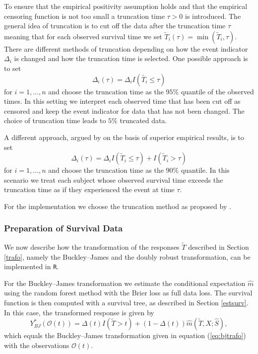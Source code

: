\documentclass[12pt, a4paper]{scrartcl}
\theoremstyle{definition}
\theoremstyle{plain}
\numberwithin{equation}{section}
\numberwithin{figure}{section}
\numberwithin{table}{section}
\begin{document}
	To ensure that the empirical positivity assumption holds and that the empirical censoring function is not too small a truncation time $\tau>0$ is introduced.
	The general idea of truncation is to cut off the data after the truncation time $\tau$ meaning that for each observed survival time we set $\tilde{T}_i(\tau)=\min(\tilde{T}_i, \tau)$.
	There are different methods of truncation depending on how the event indicator $\Delta_i$ is changed and how the truncation time is selected.
	One possible approach is to set $$\Delta_i(\tau) = \Delta_i I(\tilde{T_i} \leq \tau)$$  for $i=1,\dots,n$ and choose the truncation time as the $95\%$ quantile of the observed times.
	In this setting we interpret each observed time that has been cut off as censored and keep the event indicator for data that has not been changed.
	The choice of truncation time leads to $5\%$ truncated data.
	
	A different approach, argued by \citet*{drtrees} on the basis of superior empirical results, is to set $$\Delta_i(\tau) = \Delta_i I(\tilde{T}_i\leq \tau) + I(\tilde{T}_i > \tau)$$ for $i=1,\dots,n$ and choose the truncation time as the $90\%$ quantile.
	In this scenario we treat each subject whose observed survival time exceeds the truncation time as if they experienced the event at time $\tau$.
	
	For the implementation we choose the truncation method as proposed by \citet*{drtrees}.
	\subsubsection{Preparation of Survival Data}
	
	We now describe how the transformation of the responses $\tilde T$ described in Section \ref{trafo}, namely the Buckley--James and the doubly robust transformation, can be implemented in \texttt{R}.
	
	For the Buckley--James transformation we estimate the conditional expectation $\hat{m}$ using the random forest method with the Brier loss as full data loss.
	The survival function is then computed with a survival tree, as described in Section \ref{estsurv}.
	In this case, the transformed response is given by
	\begin{equation*}
	Y^*_{BJ}(\mathcal{O}(t)) = \Delta(t)I(\tilde T>t)+ (1-\Delta(t))\hat{m}(\tilde T, X; \hat{S}),
	\end{equation*}
	which equals the Buckley--James transformation given in equation (\ref{eq:bjtrafo}) with the observations $\mathcal{O}(t)$.
	
\end{document}
